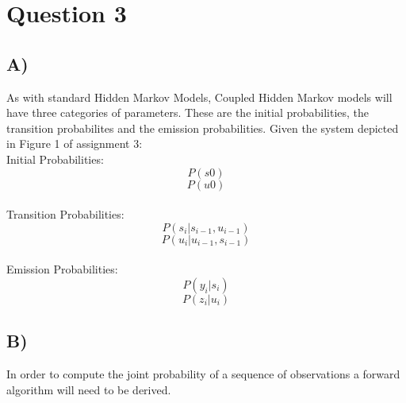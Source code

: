 \documentclass{report}
\begin{document}
\section*{Question 3}
\subsection*{A)}
As with standard Hidden Markov Models, Coupled Hidden Markov models will
have three categories of parameters. These are the initial probabilities, the
transition probabilites and the emission probabilities. Given the system
depicted in Figure 1 of assignment 3:\\

Initial Probabilities:
\begin{equation}
  P(s0)
\end{equation}
\begin{equation}
  P(u0)
\end{equation}\\

Transition Probabilities:
\begin{equation}
  P(s_i | s_{i-1}, u_{i-1})
\end{equation}
\begin{equation}
  P(u_i | u_{i-1}, s_{i-1})
\end{equation}\\

Emission Probabilities:
\begin{equation}
  P(y_i | s_i)
\end{equation}
\begin{equation}
  P(z_i | u_i)
\end{equation}

\subsection*{B)}
In order to compute the joint probability of a sequence of observations a
forward algorithm will need to be derived.
\end{document}
